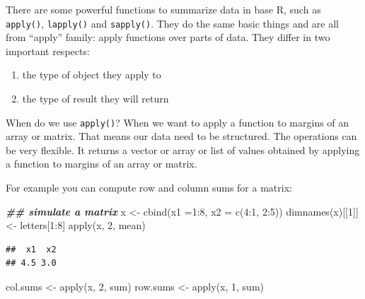 \documentclass[
  12pt,
]{krantz}
\makeatletter
\newenvironment{Shaded}{\begin{snugshade}}{\end{snugshade}}
\newcommand{\AttributeTok}[1]{\textcolor[rgb]{0.61,0.61,0.61}{#1}}
\newcommand{\DecValTok}[1]{\textcolor[rgb]{0.06,0.06,0.06}{#1}}
\newcommand{\DocumentationTok}[1]{\textcolor[rgb]{0.37,0.37,0.37}{\textbf{\textit{#1}}}}
\newcommand{\FunctionTok}[1]{\textcolor[rgb]{0,0,0}{#1}}
\newcommand{\NormalTok}[1]{#1}
\newcommand{\OtherTok}[1]{\textcolor[rgb]{0.37,0.37,0.37}{#1}}
\newcommand{\SpecialCharTok}[1]{\textcolor[rgb]{0,0,0}{#1}}
\providecommand{\tightlist}{%
  \setlength{\itemsep}{0pt}\setlength{\parskip}{0pt}}
\newenvironment{kframe}{%
\medskip{}
\setlength{\fboxsep}{.8em}
 \def\at@end@of@kframe{}%
 \ifinner\ifhmode%
  \def\at@end@of@kframe{\end{minipage}}%
  \begin{minipage}{\columnwidth}%
 \fi\fi%
 \def\FrameCommand##1{\hskip\@totalleftmargin \hskip-\fboxsep
 \colorbox{shadecolor}{##1}\hskip-\fboxsep
     \hskip-\linewidth \hskip-\@totalleftmargin \hskip\columnwidth}%
 \MakeFramed {\advance\hsize-\width
   \@totalleftmargin\z@ \linewidth\hsize
   \@setminipage}}%
 {\par\unskip\endMakeFramed%
 \at@end@of@kframe}
\renewenvironment{Shaded}{\begin{kframe}}{\end{kframe}}
\makeatother
\begin{document}
There are some powerful functions to summarize data in base R, such as \texttt{apply()}, \texttt{lapply()} and \texttt{sapply()}. They do the same basic things and are all from ``apply'' family: apply functions over parts of data. They differ in two important respects:

\begin{enumerate}
\def\labelenumi{\arabic{enumi}.}
\tightlist
\item
  the type of object they apply to
\item
  the type of result they will return
\end{enumerate}

When do we use \texttt{apply()}? When we want to apply a function to margins of an array or matrix. That means our data need to be structured. The operations can be very flexible. It returns a vector or array or list of values obtained by applying a function to margins of an array or matrix.

For example you can compute row and column sums for a matrix:

\begin{Shaded}
\begin{Highlighting}[]
\DocumentationTok{\#\# simulate a matrix}
\NormalTok{x }\OtherTok{\textless{}{-}} \FunctionTok{cbind}\NormalTok{(}\AttributeTok{x1 =}\DecValTok{1}\SpecialCharTok{:}\DecValTok{8}\NormalTok{, }\AttributeTok{x2 =} \FunctionTok{c}\NormalTok{(}\DecValTok{4}\SpecialCharTok{:}\DecValTok{1}\NormalTok{, }\DecValTok{2}\SpecialCharTok{:}\DecValTok{5}\NormalTok{))}
\FunctionTok{dimnames}\NormalTok{(x)[[}\DecValTok{1}\NormalTok{]] }\OtherTok{\textless{}{-}}\NormalTok{ letters[}\DecValTok{1}\SpecialCharTok{:}\DecValTok{8}\NormalTok{]}
\FunctionTok{apply}\NormalTok{(x, }\DecValTok{2}\NormalTok{, mean)}
\end{Highlighting}
\end{Shaded}

\begin{verbatim}
##  x1  x2 
## 4.5 3.0
\end{verbatim}

\begin{Shaded}
\begin{Highlighting}[]
\NormalTok{col.sums }\OtherTok{\textless{}{-}} \FunctionTok{apply}\NormalTok{(x, }\DecValTok{2}\NormalTok{, sum)}
\NormalTok{row.sums }\OtherTok{\textless{}{-}} \FunctionTok{apply}\NormalTok{(x, }\DecValTok{1}\NormalTok{, sum)}
\end{Highlighting}
\end{Shaded}
\end{document}
